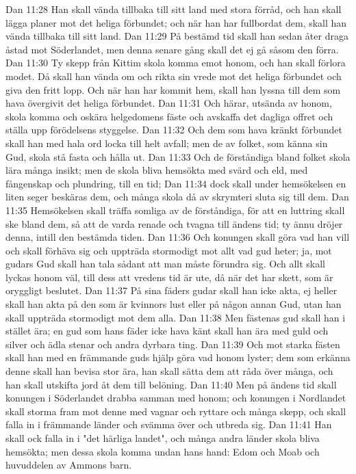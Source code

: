 Dan 11:28  Han skall vända tillbaka till sitt land med stora förråd, och han skall lägga planer mot det heliga förbundet; och när han har fullbordat dem, skall han vända tillbaka till sitt land.
Dan 11:29  På bestämd tid skall han sedan åter draga åstad mot Söderlandet, men denna senare gång skall det ej gå såsom den förra.
Dan 11:30  Ty skepp från Kittim skola komma emot honom, och han skall förlora modet. Då skall han vända om och rikta sin vrede mot det heliga förbundet och giva den fritt lopp. Och när han har kommit hem, skall han lyssna till dem som hava övergivit det heliga förbundet.
Dan 11:31  Och härar, utsända av honom, skola komma och oskära helgedomens fäste och avskaffa det dagliga offret och ställa upp förödelsens styggelse.
Dan 11:32  Och dem som hava kränkt förbundet skall han med hala ord locka till helt avfall; men de av folket, som känna sin Gud, skola stå fasta och hålla ut.
Dan 11:33  Och de förståndiga bland folket skola lära många insikt; men de skola bliva hemsökta med svärd och eld, med fångenskap och plundring, till en tid;
Dan 11:34  dock skall under hemsökelsen en liten seger beskäras dem, och många skola då av skrymteri sluta sig till dem.
Dan 11:35  Hemsökelsen skall träffa somliga av de förståndiga, för att en luttring skall ske bland dem, så att de varda renade och tvagna till ändens tid; ty ännu dröjer denna, intill den bestämda tiden.
Dan 11:36  Och konungen skall göra vad han vill och skall förhäva sig och uppträda stormodigt mot allt vad gud heter; ja, mot gudars Gud skall han tala sådant att man måste förundra sig. Och allt skall lyckas honom väl, till dess att vredens tid är ute, då när det har skett, som är oryggligt beslutet.
Dan 11:37  På sina fäders gudar skall han icke akta, ej heller skall han akta på den som är kvinnors lust eller på någon annan Gud, utan han skall uppträda stormodigt mot dem alla.
Dan 11:38  Men fästenas gud skall han i stället ära; en gud som hans fäder icke hava känt skall han ära med guld och silver och ädla stenar och andra dyrbara ting.
Dan 11:39  Och mot starka fästen skall han med en främmande guds hjälp göra vad honom lyster; dem som erkänna denne skall han bevisa stor ära, han skall sätta dem att råda över många, och han skall utskifta jord åt dem till belöning.
Dan 11:40  Men på ändens tid skall konungen i Söderlandet drabba samman med honom; och konungen i Nordlandet skall storma fram mot denne med vagnar och ryttare och många skepp, och skall falla in i främmande länder och svämma över och utbreda sig.
Dan 11:41  Han skall ock falla in i "det härliga landet", och många andra länder skola bliva hemsökta; men dessa skola komma undan hans hand: Edom och Moab och huvuddelen av Ammons barn.
